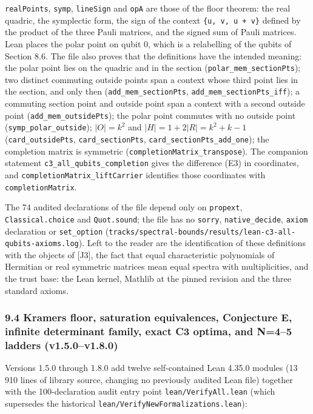 \documentclass[11pt,a4paper]{article}
\begin{document}
\texttt{realPoints}, \texttt{symp}, \texttt{lineSign} and \texttt{opA} are those of the floor theorem: the real quadric, the
symplectic form, the sign of the context \texttt{\{u,\ v,\ u\ +\ v\}} defined by the product of the three Pauli
matrices, and the signed sum of Pauli matrices. Lean places the polar point on qubit 0, which is a
relabelling of the qubits of Section 8.6. The file also proves that the definitions have the intended
meaning: the polar point lies on the quadric and in the section (\nolinkurl{polar_mem_sectionPts}); two distinct
commuting outside points span a context whose third point lies in the section, and only then
(\nolinkurl{add_mem_sectionPts}, \nolinkurl{add_mem_sectionPts_iff}); a commuting section point and outside point span a
context with a second outside point (\nolinkurl{add_mem_outsidePts}); the polar point commutes with no outside
point (\nolinkurl{symp_polar_outside}); \(|O|=k^2\) and \(|H|=1+2|R|=k^2+k-1\) (\texttt{card\_outsidePts}, \texttt{card\_sectionPts},
\nolinkurl{card_sectionPts_add_one}); the
completion matrix is symmetric (\nolinkurl{completionMatrix_transpose}). The companion statement
\nolinkurl{c3_all_qubits_completion} gives the difference (E3) in coordinates, and
\nolinkurl{completionMatrix_liftCarrier} identifies those coordinates with \texttt{completionMatrix}.

The 74 audited declarations of the file depend only on \texttt{propext}, \texttt{Classical.choice} and
\texttt{Quot.sound}; the file has no \texttt{sorry}, \texttt{native\_decide}, \texttt{axiom} declaration or \texttt{set\_option}
(\nolinkurl{tracks/spectral-bounds/results/lean-c3-all-qubits-axioms.log}). Left to the reader are the identification of these
definitions with the objects of {[}J3{]}, the fact that equal characteristic polynomials of Hermitian or
real symmetric matrices mean equal spectra with multiplicities, and the trust base: the Lean kernel,
Mathlib at the pinned revision and the three standard axioms.

\subsubsection{9.4 Kramers floor, saturation equivalences, Conjecture E, infinite determinant family, exact C3 optima, and N=4--5 ladders (v1.5.0--v1.8.0)}\label{94-kramers-floor-saturation-equivalences-conjecture-e-infinite-determinant-family-exact-c3-optima-and-n45-ladders-v150v180}

Versions 1.5.0 through 1.8.0 add twelve self-contained Lean 4.35.0 modules (13 910 lines of library
source, changing no previously audited Lean file) together with the 100-declaration audit entry point
\nolinkurl{lean/VerifyAll.lean} (which supersedes the historical \nolinkurl{lean/VerifyNewFormalizations.lean}):
\end{document}
